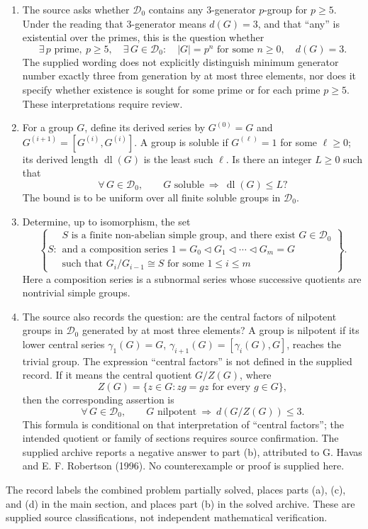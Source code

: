 \documentclass[11pt]{article}
\begin{document}
\begin{enumerate}
\item[(a)] The source asks whether \(\mathcal D_0\) contains any \(3\)-generator \(p\)-group for \(p\geq 5\). Under the reading that \(3\)-generator means \(d(G)=3\), and that ``any'' is existential over the primes, this is the question whether
\[
\exists\,p\text{ prime},\ p\geq 5,\quad \exists\,G\in\mathcal D_0:\quad |G|=p^n\text{ for some }n\geq 0,\quad d(G)=3.
\]
The supplied wording does not explicitly distinguish minimum generator number exactly three from generation by at most three elements, nor does it specify whether existence is sought for some prime or for each prime \(p\geq 5\). These interpretations require review.

\item[(c)] For a group \(G\), define its derived series by \(G^{(0)}=G\) and \(G^{(i+1)}=[G^{(i)},G^{(i)}]\). A group is soluble if \(G^{(\ell)}=1\) for some \(\ell\geq 0\); its derived length \(\operatorname{dl}(G)\) is the least such \(\ell\). Is there an integer \(L\geq 0\) such that
\[
\forall\,G\in\mathcal D_0,\qquad G\text{ soluble}\ \Longrightarrow\ \operatorname{dl}(G)\leq L?
\]
The bound is to be uniform over all finite soluble groups in \(\mathcal D_0\).

\item[(d)] Determine, up to isomorphism, the set
\[
\left\{S:\begin{array}{l}
S\text{ is a finite non-abelian simple group, and there exist }G\in\mathcal D_0\\
\text{and a composition series }1=G_0\triangleleft G_1\triangleleft\cdots\triangleleft G_m=G\\
\text{such that }G_i/G_{i-1}\cong S\text{ for some }1\leq i\leq m
\end{array}\right\}.
\]
Here a composition series is a subnormal series whose successive quotients are nontrivial simple groups.

\item[(b), archived.] The source also records the question: are the central factors of nilpotent groups in \(\mathcal D_0\) generated by at most three elements? A group is nilpotent if its lower central series \(\gamma_1(G)=G\), \(\gamma_{i+1}(G)=[\gamma_i(G),G]\), reaches the trivial group. The expression ``central factors'' is not defined in the supplied record. If it means the central quotient \(G/Z(G)\), where
\[
Z(G)=\{z\in G: zg=gz\text{ for every }g\in G\},
\]
then the corresponding assertion is
\[
\forall\,G\in\mathcal D_0,\qquad G\text{ nilpotent}\ \Longrightarrow\ d(G/Z(G))\leq 3.
\]
This formula is conditional on that interpretation of ``central factors''; the intended quotient or family of sections requires source confirmation. The supplied archive reports a negative answer to part (b), attributed to G. Havas and E. F. Robertson (1996). No counterexample or proof is supplied here.
\end{enumerate}
The record labels the combined problem partially solved, places parts (a), (c), and (d) in the main section, and places part (b) in the solved archive. These are supplied source classifications, not independent mathematical verification.
\end{document}
